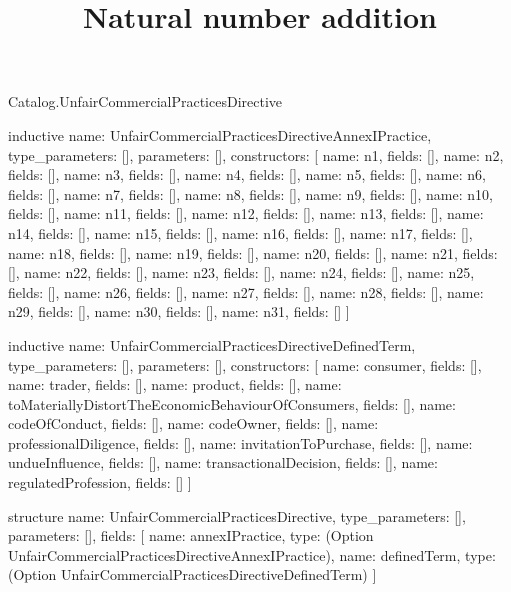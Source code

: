 \begin{lexlean}{Catalog.UnfairCommercialPracticesDirective}
\title{Natural number addition}
\begin{semanticmodule}
inductive{
  name: UnfairCommercialPracticesDirectiveAnnexIPractice,
  type_parameters: [],
  parameters: [],
  constructors: [
    {name: n1, fields: []},
    {name: n2, fields: []},
    {name: n3, fields: []},
    {name: n4, fields: []},
    {name: n5, fields: []},
    {name: n6, fields: []},
    {name: n7, fields: []},
    {name: n8, fields: []},
    {name: n9, fields: []},
    {name: n10, fields: []},
    {name: n11, fields: []},
    {name: n12, fields: []},
    {name: n13, fields: []},
    {name: n14, fields: []},
    {name: n15, fields: []},
    {name: n16, fields: []},
    {name: n17, fields: []},
    {name: n18, fields: []},
    {name: n19, fields: []},
    {name: n20, fields: []},
    {name: n21, fields: []},
    {name: n22, fields: []},
    {name: n23, fields: []},
    {name: n24, fields: []},
    {name: n25, fields: []},
    {name: n26, fields: []},
    {name: n27, fields: []},
    {name: n28, fields: []},
    {name: n29, fields: []},
    {name: n30, fields: []},
    {name: n31, fields: []}
  ]
}

inductive{
  name: UnfairCommercialPracticesDirectiveDefinedTerm,
  type_parameters: [],
  parameters: [],
  constructors: [
    {name: consumer, fields: []},
    {name: trader, fields: []},
    {name: product, fields: []},
    {name: toMateriallyDistortTheEconomicBehaviourOfConsumers, fields: []},
    {name: codeOfConduct, fields: []},
    {name: codeOwner, fields: []},
    {name: professionalDiligence, fields: []},
    {name: invitationToPurchase, fields: []},
    {name: undueInfluence, fields: []},
    {name: transactionalDecision, fields: []},
    {name: regulatedProfession, fields: []}
  ]
}

structure{
  name: UnfairCommercialPracticesDirective,
  type_parameters: [],
  parameters: [],
  fields: [
    {name: annexIPractice, type: (Option UnfairCommercialPracticesDirectiveAnnexIPractice)},
    {name: definedTerm, type: (Option UnfairCommercialPracticesDirectiveDefinedTerm)}
  ]
}
\end{semanticmodule}
\end{lexlean}

